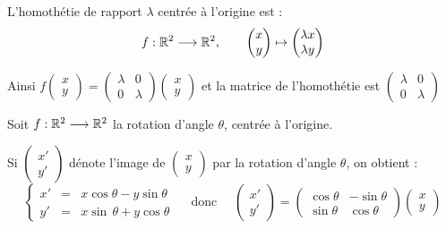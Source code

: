 \begin{frame}

L'homothétie de rapport $\lambda$ centrée à l'origine est : 
$$f: \mathbb{R}^2 \longrightarrow \mathbb{R}^2, \qquad 
\begin{pmatrix}x\\y\end{pmatrix} \mapsto \begin{pmatrix} \lambda x \\ \lambda y \end{pmatrix}$$

Ainsi 
$f\left(\begin{smallmatrix} x \\ y \end{smallmatrix}\right) = 
\left(\begin{smallmatrix} \lambda & 0 \\ 0 & \lambda \end{smallmatrix}\right)
\left(\begin{smallmatrix} x \\ y \end{smallmatrix}\right)$
et la matrice de l'homothétie est
$\begin{pmatrix} \lambda & 0 \\ 0 & \lambda \end{pmatrix}$
 

\end{frame}


\begin{frame}


Soit $f: \mathbb{R}^2 \longrightarrow \mathbb{R}^2$ la rotation d'angle $\theta$, centrée à l'origine.

Si $\left(\begin{smallmatrix}x' \\ y' \end{smallmatrix}\right)$ dénote l'image 
de $\left(\begin{smallmatrix}x \\ y \end{smallmatrix}\right)$ par la rotation d'angle
$\theta$, on obtient :
$$\left\{\begin{array}{rcl}
x' & = & x \cos  \theta - y \sin\theta\\
y' & = & x\sin \, \theta + y \cos\theta
\end{array}\right.
\quad \text{ donc }\quad 
\begin{pmatrix}x' \\ y' \end{pmatrix}
= \begin{pmatrix}
\cos\theta & -\sin\theta\\
\sin\theta & \cos\theta
\end{pmatrix}
\begin{pmatrix}x \\ y \end{pmatrix}
$$ 





\end{frame}



